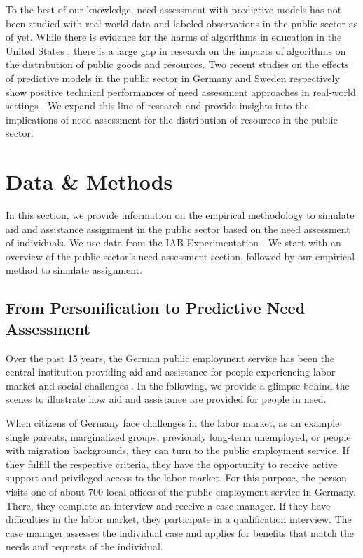 \documentclass{article} %
\begin{document}
To the best of our knowledge, need assessment with predictive models has not been studied with real-world data and labeled observations in the public sector as of yet. While there is evidence for the harms of algorithms in education in the United States \citep{chouldechova2018case}, there is a large gap in research on the impacts of algorithms on the distribution of public goods and resources. Two recent studies on the effects of predictive models in the public sector in Germany and Sweden respectively show positive technical performances of need assessment approaches in real-world settings \citep{FISCHERABAIGAR2024101976,sun2019mapping}. We expand this line of research and provide insights into the implications of need assessment for the distribution of resources in the public sector.




\section{Data \& Methods}

\label{sec:data}
In this section, we provide information on the empirical methodology to simulate aid and assistance assignment in the public sector based on the need assessment of individuals. We use data from the IAB-Experimentation \citep{athey2021policy}. We start with an overview of the public sector's need assessment section, followed by our empirical method to simulate assignment.

\subsection{From Personification to Predictive Need Assessment}
Over the past 15 years, the German public employment service has been the central institution providing aid and assistance for people experiencing labor market and social challenges \citep{Kallus03042021, wirtz2019artificial}. In the following, we provide a glimpse behind the scenes to illustrate how aid and assistance are provided for people in need.

When citizens of Germany face challenges in the labor market, as an example single parents, marginalized groups, previously long-term unemployed, or people with migration backgrounds, they can turn to the public employment service. If they fulfill the respective criteria, they have the opportunity to receive active support and privileged access to the labor market. For this purpose, the person visits one of about $700$ local offices of the public employment service in Germany. There, they complete an interview and receive a case manager. If they have difficulties in the labor market, they participate in a qualification interview. The case manager assesses the individual case and applies for benefits that match the needs and requests of the individual.
\end{document}
